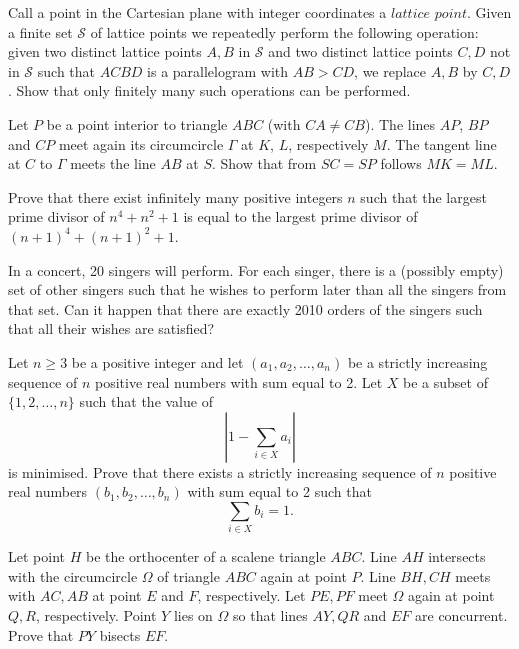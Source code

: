 \documentclass[11pt]{scrartcl}
\begin{document}
\begin{problem}[3744894000085761569]
Call a point in the Cartesian plane with integer coordinates a $lattice$ $point$. Given a finite set $\mathcal{S}$ of lattice points we repeatedly perform the following operation: given two distinct lattice points $A, B$ in $\mathcal{S}$ and two distinct lattice points $C, D$ not in $\mathcal{S}$ such that $ACBD$ is a parallelogram with $AB > CD$, we replace $A, B$ by $C, D$. Show that only finitely many such operations can be performed.
\end{problem}
\begin{problem}[182831966962001]
Let $P$ be a point interior to triangle $ABC$ (with $CA \neq CB$). The lines $AP$, $BP$ and $CP$ meet again its circumcircle $\Gamma$ at $K$, $L$, respectively $M$. The tangent line at $C$ to $\Gamma$ meets the line $AB$ at $S$. Show that from $SC = SP$ follows $MK = ML$.
\end{problem}
\begin{problem}[973663451075571]
	Prove that there exist infinitely many positive integers $n$ such that the largest prime divisor of $n^4 + n^2 + 1$ is equal to the largest prime divisor of $(n+1)^4 + (n+1)^2 +1$.
\end{problem}
\begin{problem}[866307541115519]
In a concert, 20 singers will perform. For each singer, there is a (possibly empty) set of other singers such that he wishes to perform later than all the singers from that set. Can it happen that there are exactly 2010 orders of the singers such that all their wishes are satisfied?
\end{problem}
\begin{problem}[290912955085727393]
Let $n \geqslant 3$ be a positive integer and let $\left(a_{1}, a_{2}, \ldots, a_{n}\right)$ be a strictly increasing sequence of $n$ positive real numbers with sum equal to 2. Let $X$ be a subset of $\{1,2, \ldots, n\}$ such that the value of
\[
\left|1-\sum_{i \in X} a_{i}\right|
\]is minimised. Prove that there exists a strictly increasing sequence of $n$ positive real numbers $\left(b_{1}, b_{2}, \ldots, b_{n}\right)$ with sum equal to 2 such that
\[
\sum_{i \in X} b_{i}=1.
\]
\end{problem}
\begin{problem}[844684477828422]
Let point $H$ be the orthocenter of a scalene triangle $ABC$. Line $AH$ intersects with the circumcircle $\Omega$ of triangle $ABC$ again at point $P$. Line $BH, CH$ meets with $AC,AB$ at point $E$ and $F$, respectively. Let $PE, PF$ meet $\Omega$ again at point $Q,R$, respectively. Point $Y$ lies on $\Omega$ so that lines $AY,QR$ and $EF$ are concurrent. Prove that $PY$ bisects $EF$.
\end{problem}
\end{document}
